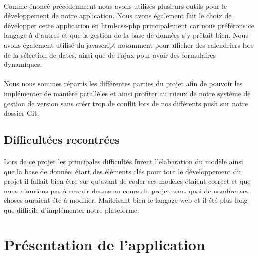 \documentclass[a4paper, 12pt]{article}
\begin{document}
\paragraph{}Comme énoncé précédemment nous avons utilisés plusieurs outils pour le développement de notre application. Nous avons également fait le choix de développer cette application en html-css-php principalement car nous préférons ce langage à d'autres et que la gestion de la base de données s'y prêtait bien. Nous avons également utilisé du javascript notamment pour afficher des calendriers lors de la sélection de dates, ainsi que de l'ajax pour avoir des formulaires dynamiques.
\paragraph{}Nous nous sommes répartis les différentes parties du projet afin de pouvoir les implémenter de manière parallèles et ainsi profiter au mieux de notre système de gestion de version sans créer trop de conflit lors de nos différents push sur notre dossier Git.

\newpage
\subsection{Difficultées recontrées}
\paragraph{}Lors de ce projet les principales difficultés furent l'élaboration du modèle ainsi que la base de donnée, étant des éléments clés pour tout le développement du projet il fallait bien être sur qu'avant de coder ces modèles étaient correct et que nous n'aurions pas à revenir dessus au cours du projet, sans quoi de nombreuses choses auraient été à modifier. Maitrisant bien le langage web et il été plus long que difficile d'implémenter notre plateforme.

\newpage

\section{Présentation de l'application}
\end{document}
